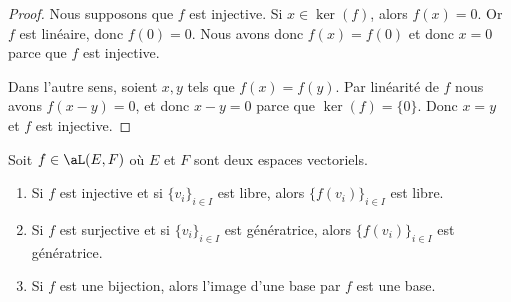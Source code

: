 \begin{proof}
	Nous supposons que \( f\) est injective. Si \( x\in\ker(f)\), alors \( f(x)=0\). Or \( f\) est linéaire, donc \( f(0)=0\). Nous avons donc \( f(x)=f(0)\) et donc \( x=0\) parce que \( f\) est injective.

	Dans l'autre sens, soient \( x,y\) tels que \( f(x)=f(y)\). Par linéarité de \( f\) nous avons \( f(x-y)=0\), et donc \( x-y=0\) parce que \( \ker(f)=\{0\}\). Donc \( x=y\) et \( f\) est injective.
\end{proof}

\begin{proposition}      \label{PROPooZFKZooBGLSex}
	Soit \( f\in \aL(E,F)\) où \( E\) et \( F\) sont deux espaces vectoriels.
	\begin{enumerate}
		\item   \label{ITEMooPPMEooIaZqtm}
		      Si \( f\) est injective et si \( \{v_i\}_{i\in I}\) est libre, alors \( \{f(v_i)\}_{i\in I}\) est libre.
		\item   \label{ITEMooOZSPooQBrDGi}
		      Si \( f\) est surjective et si \( \{v_i\}_{i\in I}\) est génératrice, alors \( \{f(v_i)\}_{i\in I}\) est génératrice.
		\item   \label{ITEMooOIEYooIfdFnv}
		      Si \( f\) est une bijection, alors l'image d'une base par \( f\) est une base.
	\end{enumerate}
\end{proposition}

